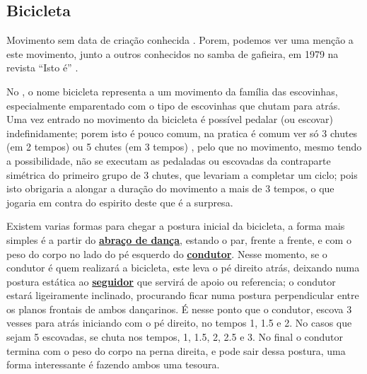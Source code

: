 \subsection{Bicicleta}

Movimento sem data de criação conhecida \cite[pp. 143,144]{perna2002samba}.
Porem, podemos ver uma menção a este movimento, junto a outros conhecidos no samba de gafieira, 
em 1979 na revista ``Isto é'' \cite[pp. 89]{revista1979isto}.

No \AnoLivro, o nome bicicleta representa a um movimento da família das escovinhas,
especialmente emparentado com o tipo de escovinhas que chutam para atrás.
Uma vez entrado no movimento da bicicleta é possível pedalar (ou escovar) indefinidamente;
porem isto é pouco comum, na pratica é comum ver só 3 chutes (em 2 tempos) ou 5 chutes (em 3 tempos) ,
pelo que no movimento, mesmo tendo a possibilidade, 
não se executam as pedaladas ou escovadas da contraparte simétrica do primeiro grupo de 3 chutes,
que levariam a completar um ciclo;
pois isto obrigaria a alongar a duração do movimento a mais de 3 tempos,
o que jogaria em contra do espirito deste que é a surpresa.

Existem varias formas para chegar a postura inicial da bicicleta,  
a forma mais simples é a partir do \hyperref[def:abracodedanca]{\textbf{abraço de dança}},
estando o par, frente a frente, 
e com o peso do corpo no lado do pé esquerdo do \hyperref[def:Condutor]{\textbf{condutor}}.
Nesse momento, se o condutor é quem realizará a bicicleta, 
este leva o pé direito atrás,
deixando numa postura estática ao \hyperref[def:Seguidor]{\textbf{seguidor}} 
que servirá de apoio ou referencia;   
o condutor estará ligeiramente inclinado,
procurando ficar numa postura perpendicular entre os planos frontais de ambos dançarinos.
É nesse ponto que o condutor, escova 3 vesses para atrás iniciando com o pé direito,
no tempos 1, 1.5 e 2. No casos que sejam 5 escovadas, se chuta nos tempos,
1, 1.5, 2, 2.5 e 3. No final o condutor termina com o peso do corpo na perna direita,
e pode sair dessa postura, uma forma interessante é fazendo ambos uma tesoura.


